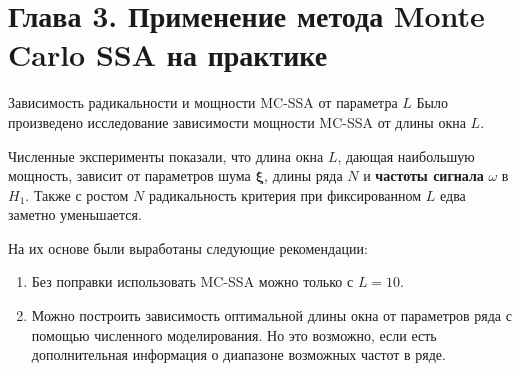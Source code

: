 \documentclass[pdf,notheorems,10pt,intlimits, unicode]{beamer}
\begin{document}
\section{Глава 3. Применение метода Monte Carlo SSA на практике}
\begin{frame}{Зависимость радикальности и мощности MC-SSA от
  параметра $L$}
  Было произведено исследование зависимости мощности MC-SSA от длины окна $L$.\medskip

  Численные эксперименты показали, что длина окна $L$, дающая наибольшую мощность, зависит от параметров шума $\boldsymbol{\xi}$, длины ряда $N$ и \textbf{частоты сигнала} $\omega$ в $H_1$. Также с ростом $N$ радикальность критерия при фиксированном $L$ едва заметно уменьшается.\medskip

  На их основе были выработаны следующие рекомендации:
  \begin{enumerate}
    \item Без поправки использовать MC-SSA можно только с $L=10$.
    \item Можно построить зависимость оптимальной длины окна от параметров ряда с помощью численного моделирования. Но это возможно, если есть дополнительная информация о диапазоне возможных частот в ряде.
  \end{enumerate}
\end{frame}
\end{document}

